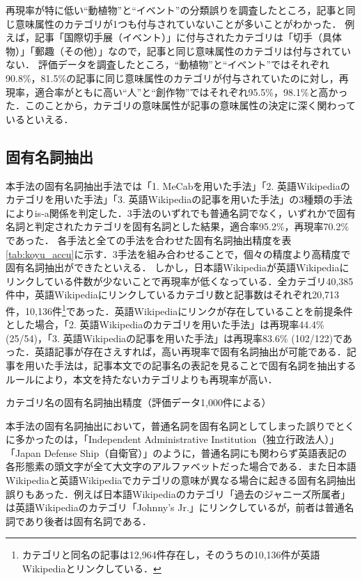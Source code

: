 \documentclass[japanese]{jnlp_1.4}
\begin{document}
再現率が特に低い``動植物''と``イベント''の分類誤りを調査したところ，記事と同じ意味属性のカテゴリが1つも付与されていないことが多いことがわかった．
例えば，記事「国際切手展（イベント）」に付与されたカテゴリは「切手（具体物）」「郵趣（その他）」なので，記事と同じ意味属性のカテゴリは付与されていない．
評価データを調査したところ，``動植物''と``イベント''ではそれぞれ90.8\%，81.5\%の記事に同じ意味属性のカテゴリが付与されていたのに対し，再現率，適合率がともに高い``人''と``創作物''ではそれぞれ95.5\%，98.1\%と高かった．このことから，カテゴリの意味属性が記事の意味属性の決定に深く関わっているといえる．



\subsection{固有名詞抽出}
\label{sec:koyu_kekka}

本手法の固有名詞抽出手法では「1. MeCabを用いた手法」「2. 英語Wikipediaのカテゴリを用いた手法」「3. 英語Wikipediaの記事を用いた手法」の3種類の手法によりis-a関係を判定した．3手法のいずれでも普通名詞でなく，いずれかで固有名詞と判定されたカテゴリを固有名詞とした結果，適合率95.2\%，再現率70.2\%であった．
各手法と全ての手法を合わせた固有名詞抽出精度を表\ref{tab:koyu_accu}に示す．3手法を組み合わせることで，個々の精度より高精度で固有名詞抽出ができたといえる．
しかし，日本語Wikipediaが英語Wikipediaにリンクしている件数が少ないことで再現率が低くなっている．全カテゴリ40,385件中，英語Wikipediaにリンクしているカテゴリ数と記事数はそれぞれ20,713件，10,136件\footnote{カテゴリと同名の記事は12,964件存在し，そのうちの10,136件が英語Wikipediaとリンクしている．}であった．英語Wikipediaにリンクが存在していることを前提条件とした場合，「2. 英語Wikipediaのカテゴリを用いた手法」は再現率44.4\% (25/54)，「3. 英語Wikipediaの記事を用いた手法」は再現率83.6\% (102/122)であった．英語記事が存在さえすれば，高い再現率で固有名詞抽出が可能である．記事を用いた手法は，記事本文での記事名の表記を見ることで固有名詞を抽出するルールにより，本文を持たないカテゴリよりも再現率が高い．

\begin{table}[b]
\caption{カテゴリ名の固有名詞抽出精度（評価データ1,000件による）}
\label{tab:koyu_accu}

\end{table}

本手法の固有名詞抽出において，普通名詞を固有名詞としてしまった誤りでとくに多かったのは，「Independent Administrative Institution（独立行政法人）」「Japan Defense Ship（自衛官）」のように，普通名詞にも関わらず英語表記の各形態素の頭文字が全て大文字のアルファベットだった場合である．また日本語Wikipediaと英語Wikipediaでカテゴリの意味が異なる場合に起きる固有名詞抽出誤りもあった．例えば日本語Wikipediaのカテゴリ「過去のジャニーズ所属者」は英語Wikipediaのカテゴリ「Johnny's Jr.」にリンクしているが，前者は普通名詞であり後者は固有名詞である．
\end{document}
